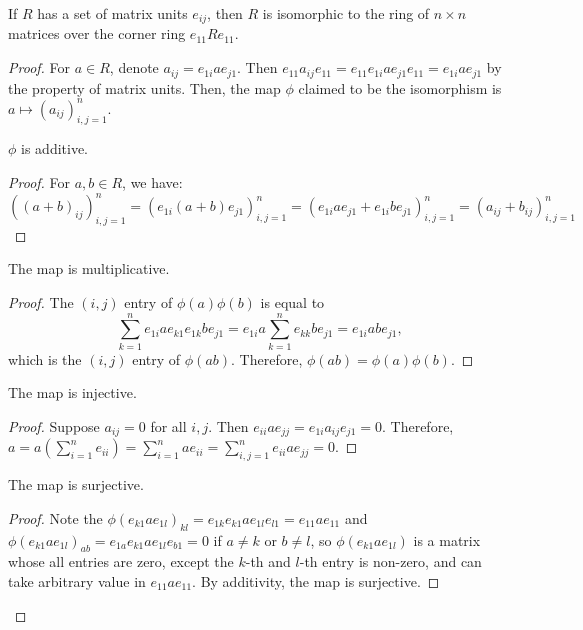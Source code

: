 \begin{theorem}
  \label{thm:ring_with_matrix_units}
  \leanok
  If $R$ has a set of matrix units $e_{ij}$, then $R$ is isomorphic to the ring of $n \times n$ matrices over the corner ring $e_{11}Re_{11}$.
\end{theorem}
\begin{proof}
  \leanok
  For $a \in R$, denote $a_{ij} = e_{1i}ae_{j1}$. Then $e_{11}a_{ij}e_{11} = e_{11}e_{1i}ae_{j1}e_{11} = e_{1i}ae_{j1}$ by the property of matrix units. Then, the map $\phi$ claimed to be the isomorphism is $a \mapsto (a_{ij})_{i,j=1}^n$.
  \begin{claim}
    $\phi$ is additive.
  \end{claim}
  \begin{proof}
    \leanok
    For $a, b \in R$, we have:
    $((a + b)_{ij})_{i,j=1}^n = (e_{1i}(a + b)e_{j1})_{i,j=1}^n = (e_{1i}ae_{j1} + e_{1i}be_{j1})_{i,j=1}^n = (a_{ij} + b_{ij})_{i,j=1}^n$
  \end{proof}
  \begin{claim}
    The map is multiplicative.
  \end{claim}
  \begin{proof}
    \leanok
    The $(i,j)$ entry of $\phi(a)\phi(b)$ is equal to
    $$
      \sum_{k=1}^n e_{1i}ae_{k1}e_{1k}be_{j1} = e_{1i}a \sum_{k=1}^n e_{kk} be_{j1} = e_{1i}abe_{j1},
    $$
    which is the $(i,j)$ entry of $\phi(ab)$. Therefore, $\phi(ab) = \phi(a)\phi(b)$.
  \end{proof}
  \begin{claim}
    The map is injective.
  \end{claim}
  \begin{proof}
    \leanok
    Suppose $a_{ij} = 0$ for all $i, j$. Then $e_{ii}ae_{jj} = e_{1i}a_{ij}e_{j1} = 0$. Therefore, $a = a(\sum_{i=1}^n e_{ii}) = \sum_{i=1}^n ae_{ii} = \sum_{i,j=1}^n e_{ii}ae_{jj} = 0$.
  \end{proof}
  \begin{claim}
    The map is surjective.
  \end{claim}
  \begin{proof}
    \leanok
    Note the $\phi(e_{k1}ae_{1l})_{kl} = e_{1k}e_{k1}a e_{1l}e_{l1} = e_{11}ae_{11}$ and $\phi(e_{k1}ae_{1l})_{ab} = e_{1a}e_{k1}a e_{1l}e_{b1} = 0$ if $a \neq k$ or $b \neq l$, so $\phi(e_{k1}ae_{1l})$ is a matrix whose all entries are zero, except the $k$-th and $l$-th entry is non-zero, and can take arbitrary value in $e_{11}ae_{11}$. By additivity, the map is surjective.
  \end{proof}
\end{proof}

